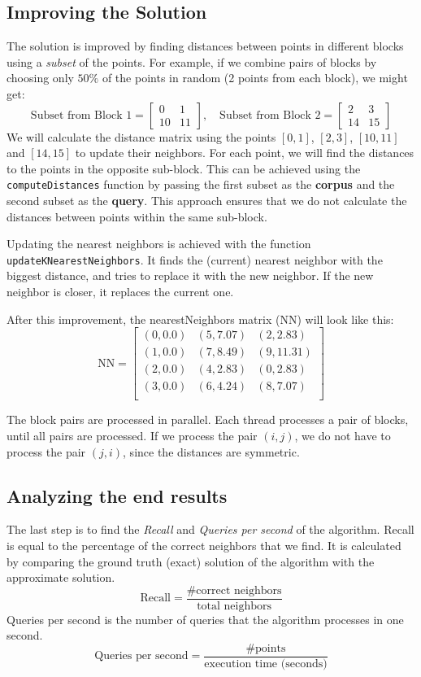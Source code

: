 \documentclass{article}
\begin{document}
\subsection{Improving the Solution}
The solution is improved by finding distances between points in different blocks using a \emph{subset} of the points. 
For example, if we combine pairs of blocks by choosing only $50\%$ of the points in random (2 points from each block),
we might get:
\[
\text{Subset from Block 1} = \begin{bmatrix}
0 & 1 \\
10 & 11
\end{bmatrix}, \quad
\text{Subset from Block 2} = \begin{bmatrix}
2 & 3 \\
14 & 15
\end{bmatrix}
\]
We will calculate the distance matrix using the points $[0, 1]$, $[2, 3]$, $[10, 11]$ and $[14, 15]$ to update their
neighbors. For each point, we will find the distances to the points in the opposite sub-block. This can be
achieved using the \texttt{computeDistances} function by passing the first subset as the \textbf{corpus} and the second
subset as the \textbf{query}. This approach ensures that we do not calculate the distances between points within
the same sub-block.

Updating the nearest neighbors is achieved with the function \texttt{updateKNearestNeighbors}. It finds the (current) nearest neighbor with
the biggest distance, and tries to replace it with the new neighbor. If the new neighbor is closer, it replaces the current one.

After this improvement, the nearestNeighbors matrix (NN) will look like this:
\[
\text{NN} = \begin{bmatrix}
(0, 0.0) & (5, 7.07) & (2, 2.83) \\
(1, 0.0) & (7, 8.49) & (9, 11.31) \\
(2, 0.0) & (4, 2.83) & (0, 2.83) \\
(3, 0.0) & (6, 4.24) & (8, 7.07) \\
\end{bmatrix}
\]

The block pairs are processed in parallel. Each thread processes a pair of blocks, until all pairs are processed.
If we process the pair $(i, j)$, we do not have to process the pair $(j, i)$, since the distances are symmetric.

\subsection{Analyzing the end results}
The last step is to find the \emph{Recall} and \emph{Queries per second} of the algorithm. Recall is equal to the percentage of the
correct neighbors that we find. It is calculated by comparing the ground truth (exact) solution of the algorithm with the 
approximate solution.
\[
\text{Recall} = \frac{\text{\# correct neighbors}}{\text{total neighbors}}
\]
Queries per second is the number of queries that the algorithm processes in one second. 
\[
\text{Queries per second} = \frac{\text{\# points}}{\text{execution time (seconds)}}
\]
\end{document}
